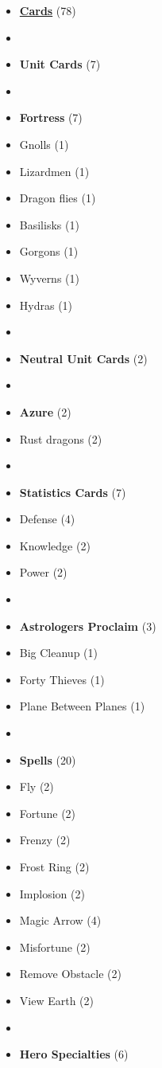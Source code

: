 \begin{multicols*}{3}
\begin{itemize}[leftmargin=0pt, label={}, noitemsep, noitemsep]
  \item \textbf{\small{\underline{Cards}}} (78)
  \item
  \item \textbf{Unit Cards} (7)
  \item
  \item \textbf{Fortress} (7)
  \item Gnolls (1)
  \item Lizardmen (1)
  \item Dragon flies (1)
  \item Basilisks (1)
  \item Gorgons (1)
  \item Wyverns (1)
  \item Hydras (1)
  \item
  \item \textbf{Neutral Unit Cards} (2)
  \item
  \item \textbf{Azure} (2)
  \item Rust dragons (2)
  \item
  \item \textbf{Statistics Cards} (7)
  \item Defense (4)
  \item Knowledge (2)
  \item Power (2)
  \item
  \item \textbf{Astrologers Proclaim} (3)
  \item Big Cleanup (1)
  \item Forty Thieves (1)
  \item Plane Between Planes (1)
  \item
  \item \textbf{Spells} (20)
  \item Fly (2)
  \item Fortune (2)
  \item Frenzy (2)
  \item Frost Ring (2)
  \item Implosion (2)
  \item Magic Arrow (4)
  \item Misfortune (2)
  \item Remove Obstacle (2)
  \item View Earth (2)
  \item
  \item \textbf{Hero Specialties} (6)

\end{itemize}
\end{multicols*}
